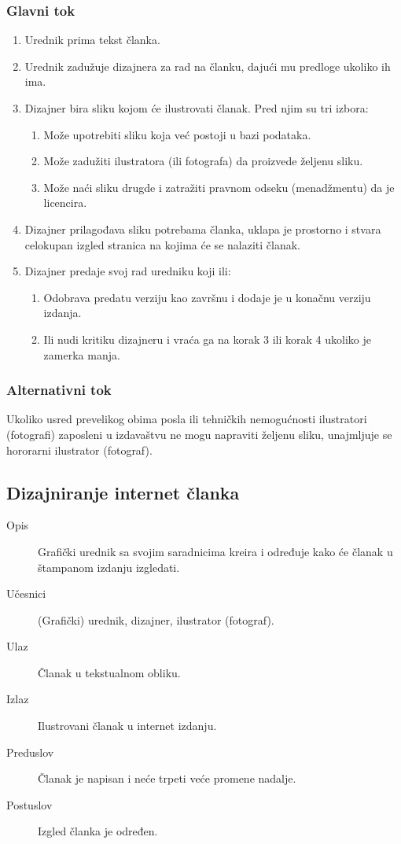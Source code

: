\subsubsection{Glavni tok}
\begin{enumerate} 
\item Urednik prima tekst članka.
\item Urednik zadužuje dizajnera za rad na članku, dajući mu predloge ukoliko ih ima.
\item Dizajner bira sliku kojom će ilustrovati članak. Pred njim su tri izbora:
\begin{enumerate}
\item Može upotrebiti sliku koja već postoji u bazi podataka.
\item Može zadužiti ilustratora (ili fotografa) da proizvede željenu sliku.
\item Može naći sliku drugde i zatražiti pravnom odseku (menadžmentu) da je licencira.
\end{enumerate}
\item Dizajner prilagođava sliku potrebama članka,
uklapa je prostorno i stvara celokupan izgled stranica na kojima će se nalaziti članak.
\item Dizajner predaje svoj rad uredniku koji ili:
\begin{enumerate}
\item Odobrava predatu verziju kao završnu i dodaje je u konačnu verziju izdanja.
\item Ili nudi kritiku dizajneru i vraća ga na korak 3 ili korak 4 ukoliko je zamerka manja.
\end{enumerate}
\end{enumerate}
\subsubsection{Alternativni tok}
Ukoliko usred prevelikog obima posla ili tehničkih nemogućnosti ilustratori (fotografi) zaposleni u izdavaštvu ne mogu napraviti željenu sliku, unajmljuje se hororarni ilustrator (fotograf).

\subsection{Dizajniranje internet članka}
\begin{description}
\item [Opis] Grafički urednik sa svojim saradnicima kreira i određuje kako će članak u štampanom izdanju izgledati.
\item [Učesnici] (Grafički) urednik, dizajner, ilustrator (fotograf).
\item [Ulaz] Članak u tekstualnom obliku.
\item [Izlaz] Ilustrovani članak u internet izdanju.
\item [Preduslov] Članak je napisan i neće trpeti veće promene nadalje.
\item [Postuslov] Izgled članka je određen.
\end{description}
